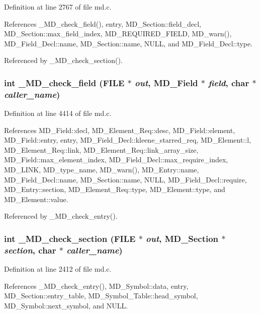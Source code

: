 Definition at line 2767 of file md.c.

References \_\-MD\_\-check\_\-field(), entry, MD\_\-Section::field\_\-decl, MD\_\-Section::max\_\-field\_\-index, MD\_\-REQUIRED\_\-FIELD, MD\_\-warn(), MD\_\-Field\_\-Decl::name, MD\_\-Section::name, NULL, and MD\_\-Field\_\-Decl::type.

Referenced by \_\-MD\_\-check\_\-section().
\subsubsection{\setlength{\rightskip}{0pt plus 5cm}int \_\-MD\_\-check\_\-field (FILE $\ast$ {\em out}, \bf{MD\_\-Field} $\ast$ {\em field}, char $\ast$ {\em caller\_\-name})}\label{md_8h_e357e99d4f9c07917d1bc2e4c6859381}




Definition at line 4414 of file md.c.

References MD\_\-Field::decl, MD\_\-Element\_\-Req::desc, MD\_\-Field::element, MD\_\-Field::entry, entry, MD\_\-Field\_\-Decl::kleene\_\-starred\_\-req, MD\_\-Element::l, MD\_\-Element\_\-Req::link, MD\_\-Element\_\-Req::link\_\-array\_\-size, MD\_\-Field::max\_\-element\_\-index, MD\_\-Field\_\-Decl::max\_\-require\_\-index, MD\_\-LINK, MD\_\-type\_\-name, MD\_\-warn(), MD\_\-Entry::name, MD\_\-Field\_\-Decl::name, MD\_\-Section::name, NULL, MD\_\-Field\_\-Decl::require, MD\_\-Entry::section, MD\_\-Element\_\-Req::type, MD\_\-Element::type, and MD\_\-Element::value.

Referenced by \_\-MD\_\-check\_\-entry().
\subsubsection{\setlength{\rightskip}{0pt plus 5cm}int \_\-MD\_\-check\_\-section (FILE $\ast$ {\em out}, \bf{MD\_\-Section} $\ast$ {\em section}, char $\ast$ {\em caller\_\-name})}\label{md_8h_89a6fbf3ae7039a7f31768a50b21c521}




Definition at line 2412 of file md.c.

References \_\-MD\_\-check\_\-entry(), MD\_\-Symbol::data, entry, MD\_\-Section::entry\_\-table, MD\_\-Symbol\_\-Table::head\_\-symbol, MD\_\-Symbol::next\_\-symbol, and NULL.

